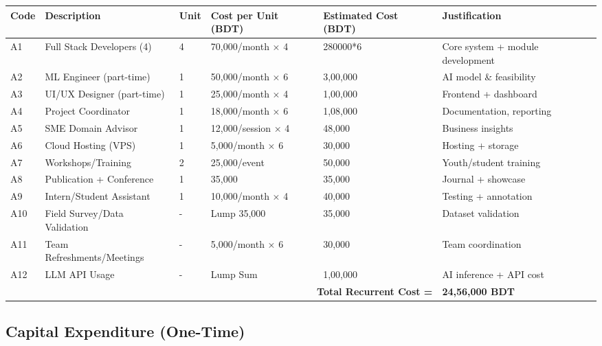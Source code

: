 \documentclass[12pt,letterpaper]{article}
\begin{document}
\begin{longtable}{|p{1cm}|p{3.5cm}|p{1cm}|p{2.5cm}|p{2.5cm}|p{3.5cm}|}
\hline
\textbf{Code} & \textbf{Description} & \textbf{Unit} & \textbf{Cost per Unit (BDT)} & \textbf{Estimated Cost (BDT)} & \textbf{Justification} \\
\hline
A1 & Full Stack Developers (4) & 4 & 70,000/month × 4 & 280000*6 & Core system + module development \\
\hline
A2 & ML Engineer (part-time) & 1 & 50,000/month × 6 & 3,00,000 & AI model \& feasibility \\
\hline
A3 & UI/UX Designer (part-time) & 1 & 25,000/month × 4 & 1,00,000 & Frontend + dashboard \\
\hline
A4 & Project Coordinator & 1 & 18,000/month × 6 & 1,08,000 & Documentation, reporting \\
\hline
A5 & SME Domain Advisor & 1 & 12,000/session × 4 & 48,000 & Business insights \\
\hline
A6 & Cloud Hosting (VPS) & 1 & 5,000/month × 6 & 30,000 & Hosting + storage \\
\hline
A7 & Workshops/Training & 2 & 25,000/event & 50,000 & Youth/student training \\
\hline
A8 & Publication + Conference & 1 & 35,000 & 35,000 & Journal + showcase \\
\hline
A9 & Intern/Student Assistant & 1 & 10,000/month × 4 & 40,000 & Testing + annotation \\
\hline
A10 & Field Survey/Data Validation & - & Lump 35,000 & 35,000 & Dataset validation \\
\hline
A11 & Team Refreshments/Meetings & - & 5,000/month × 6 & 30,000 & Team coordination \\
\hline
A12 & LLM API Usage & - & Lump Sum & 1,00,000 & AI inference + API cost \\
\hline
\multicolumn{5}{|r|}{\textbf{Total Recurrent Cost =}} & \textbf{24,56,000 BDT} \\
\hline
\end{longtable}

\subsection{Capital Expenditure (One-Time)}
\end{document}
